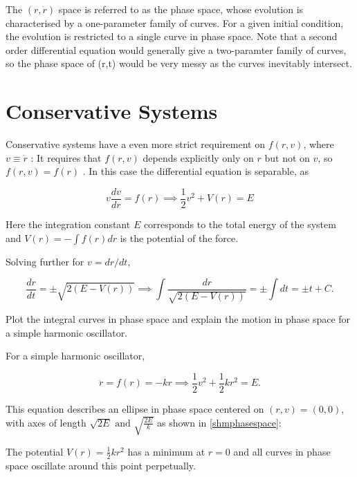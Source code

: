 \documentclass[english,a4paper,12pt]{report}
\begin{document}
The \((r,\dot{r} )\) space is referred to as the phase space, whose evolution is characterised by a one-parameter family of curves. For a given initial condition, the evolution is restricted to a single curve in phase space. Note that a second order differential equation would generally give a two-paramter family of curves, so the phase space of (r,t) would be very messy as the curves inevitably intersect.

\section{Conservative Systems}

Conservative systems have a even more strict requirement on \(f(r,v)\), where \(v \equiv \dot{r} \) : It requires that \(f(r,v)\) depends explicitly only on \(r\) but not on \(v\), so \(f(r,v) = f(r)\) . In this case the differential equation is separable, as

\begin{equation}
    v\frac{dv}{dr} = f(r) \implies \frac{1}{2} v^2+ V(r) = E
\end{equation}

Here the integration constant \(E\) corresponds to the total energy of the system and \(V(r) = - \int f(r)dr\) is the potential of the force. 

Solving further for \(v = dr /dt \), 

\begin{equation}
    \frac{dr}{dt} = \pm \sqrt{2(E-V(r))} \implies \int \frac{dr}{\sqrt{2(E-V(r))} } = \pm \int dt = \pm t + C. 
\end{equation}

{Plot the integral curves in phase space and explain the motion in phase space for a simple harmonic oscillator.}
{For a simple harmonic oscillator,

\begin{equation}
    \ddot{r} = f(r) = -kr \implies  \frac{1}{2}v^2 + \frac{1}{2}kr^2 = E . 
\end{equation}

This equation describes an ellipse in phase space centered on \((r,v) = (0,0)\), with axes of length \(\sqrt{2E} \text { and } \sqrt{\frac{2E}{k} }  \) as shown in \cref{shmphasespace}:

The potential \(V(r) = \frac{1}{2} kr^2 \) has a minimum at \(r=0\) and all curves in phase space oscillate around this point perpetually.  
} 
\end{document}
